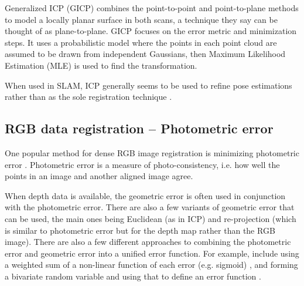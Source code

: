 \documentclass[12pt,a4paper]{article}
\begin{document}
    Generalized ICP (GICP) \cite{segal2009generalized} combines the point-to-point and point-to-plane methods to model a locally planar surface in both scans, a technique they say can be thought of as plane-to-plane. GICP focuses on the error metric and minimization steps. It uses a probabilistic model where the points in each point cloud are assumed to be drawn from independent Gaussians, then Maximum Likelihood Estimation (MLE) is used to find the transformation.
     
    When used in SLAM, ICP generally seems to be used to refine pose estimations rather than as the sole registration technique \cite{engelhard2011real,henry2012rgb}.


  \subsection{RGB data registration -- Photometric error}
    \label{ssec: LR photmetric}
    One popular method for dense RGB image registration is minimizing photometric error \cite{kerl2013dense,bartoli2008groupwise,newcombe2011dtam}. Photometric error is a measure of photo-consistency, i.e. how well the points in an image and another aligned image agree. 
     
    When depth data is available, the geometric error is often used in conjunction with the photometric error. There are also a few variants of geometric error that can be used, the main ones being Euclidean (as in ICP) and re-projection (which is similar to photometric error but for the depth map rather than the RGB image). There are also a few different approaches to combining the photometric error and geometric error into a unified error function. For example, include using a weighted sum of a non-linear function of each error (e.g. sigmoid) \cite{morency2002stereo}, and forming a bivariate random variable and using that to define an error function \cite{kerl2013dense}.
\end{document}

